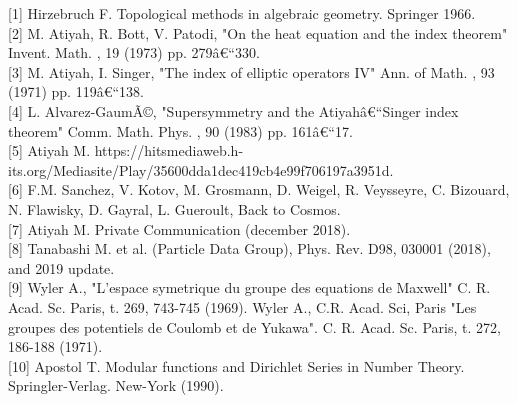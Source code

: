 \documentclass[a4paper,9pt]{article}
\begin{document}
  



\begin{thebibliography}{1}

[1]  Hirzebruch F. Topological methods in algebraic geometry. Springer 1966.\\

[2]  M. Atiyah, R. Bott, V. Patodi, "On the heat equation and the index theorem" Invent. Math. , 19 (1973) pp. 279â€“330.\\

[3]  M. Atiyah, I. Singer, "The index of elliptic operators IV" Ann. of Math. , 93 (1971) pp. 119â€“138. \\

[4]  L. Alvarez-GaumÃ©, "Supersymmetry and the Atiyahâ€“Singer index theorem" Comm. Math. Phys. , 90 (1983) pp. 161â€“17.\\

[5] Atiyah M. https://hitsmediaweb.h-its.org/Mediasite/Play/35600dda1dec419cb4e99f706197a3951d. \\ 


[6] F.M. Sanchez, V. Kotov, M. Grosmann, D. Weigel, R. Veysseyre, C. Bizouard, N. Flawisky, D. Gayral, L. Gueroult, Back to Cosmos.\\

[7]  Atiyah M. Private Communication (december 2018).\\

[8] Tanabashi M. et al. (Particle Data Group), Phys. Rev. D98, 030001 (2018), and 2019 update.\\

[9]  Wyler A., "L'espace symetrique du groupe des equations de Maxwell" C. R. Acad. Sc. Paris, t. 269, 743-745 (1969). Wyler A., C.R. Acad. Sci, Paris "Les groupes des potentiels de Coulomb et de Yukawa". C. R. Acad. Sc. Paris, t. 272, 186-188 (1971).\\

[10]   Apostol T. Modular functions and Dirichlet Series in Number Theory. Springler-Verlag. New-York (1990).\\


\end{thebibliography}
\end{document}
